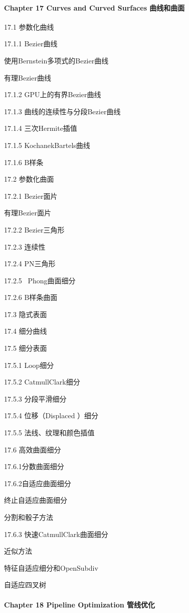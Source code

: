\documentclass[
  paper=a4,
  ,captions=tableheading
]{scrartcl}
\begin{document}
\paragraph{Chapter 17 Curves and Curved Surfaces
曲线和曲面}\label{chapter-17-curves-and-curved-surfaces-ux66f2ux7ebfux548cux66f2ux9762}

17.1 参数化曲线

17.1.1 Bezier曲线

使用Bernstein多项式的Bezier曲线

有理Bezier曲线

17.1.2 GPU上的有界Bezier曲线

17.1.3 曲线的连续性与分段Bezier曲线

17.1.4 三次Hermite插值

17.1.5 KochanekBartels曲线

17.1.6 B样条

17.2 参数化曲面

17.2.1 Bezier面片

有理Bezier面片

17.2.2 Bezier三角形

17.2.3 连续性

17.2.4 PN三角形

17.2.5 ~Phong曲面细分

17.2.6 B样条曲面

17.3 隐式表面

17.4 细分曲线

17.5 细分表面

17.5.1 Loop细分

17.5.2 CatmullClark细分

17.5.3 分段平滑细分

17.5.4 位移（Displaced ）细分

17.5.5 法线、纹理和颜色插值

17.6 高效曲面细分

17.6.1分数曲面细分

17.6.2自适应曲面细分

终止自适应曲面细分

分割和骰子方法

17.6.3 快速CatmullClark曲面细分

近似方法

特征自适应细分和OpenSubdiv

自适应四叉树

\paragraph{Chapter 18 Pipeline Optimization
管线优化}\label{chapter-18-pipeline-optimization-ux7ba1ux7ebfux4f18ux5316}
\end{document}
